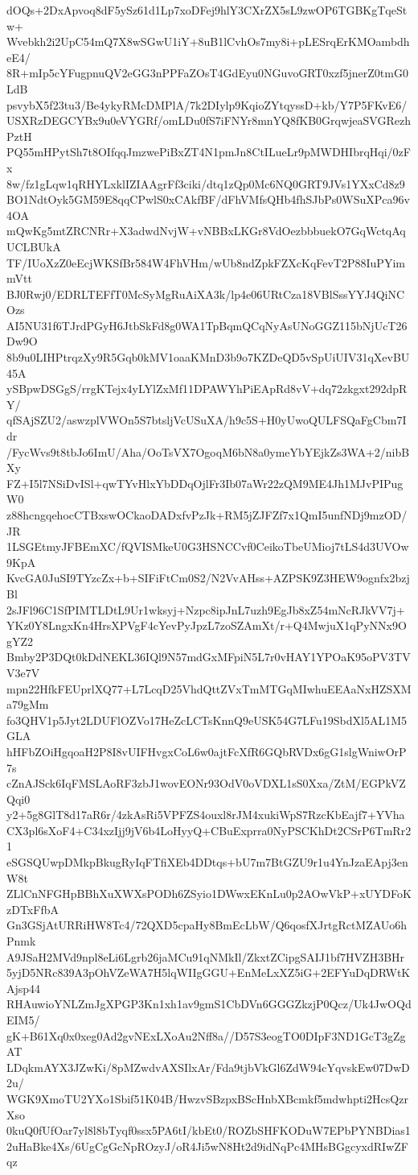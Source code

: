 dOQs+2DxApvoq8dF5ySz61d1Lp7xoDFej9hlY3CXrZX5sL9zwOP6TGBKgTqeStw+
Wvebkh2i2UpC54mQ7X8wSGwU1iY+8uB1lCvhOs7my8i+pLESrqErKMOambdheE4/
8R+mIp5cYFugpnuQV2eGG3nPPFaZOsT4GdEyu0NGuvoGRT0xzf5jnerZ0tmG0LdB
psvybX5f23tu3/Be4ykyRMcDMPlA/7k2DIylp9KqioZYtqyssD+kb/Y7P5FKvE6/
USXRzDEGCYBx9u0eVYGRf/omLDu0fS7iFNYr8mnYQ8fKB0GrqwjeaSVGRezhPztH
PQ55mHPytSh7t8OIfqqJmzwePiBxZT4N1pmJn8CtILueLr9pMWDHIbrqHqi/0zFx
8w/fz1gLqw1qRHYLxklIZIAAgrFf3ciki/dtq1zQp0Mc6NQ0GRT9JVs1YXxCd8z9
BO1NdtOyk5GM59E8qqCPwlS0xCAkfBF/dFhVMfsQHb4fhSJbPs0WSuXPca96v4OA
mQwKg5mtZRCNRr+X3adwdNvjW+vNBBxLKGr8VdOezbbbuekO7GqWctqAqUCLBUkA
TF/IUoXzZ0eEcjWKSfBr584W4FhVHm/wUb8ndZpkFZXcKqFevT2P88IuPYimmVtt
BJ0Rwj0/EDRLTEFfT0McSyMgRuAiXA3k/lp4e06URtCza18VBlSssYYJ4QiNCOzs
AI5NU31f6TJrdPGyH6JtbSkFd8g0WA1TpBqmQCqNyAsUNoGGZ115bNjUcT26Dw9O
8b9u0LIHPtrqzXy9R5Gqb0kMV1oaaKMnD3b9o7KZDeQD5vSpUiUIV31qXevBU45A
ySBpwDSGgS/rrgKTejx4yLYlZxMf11DPAWYhPiEApRd8vV+dq72zkgxt292dpRY/
qfSAjSZU2/aswzplVWOn5S7btsljVcUSuXA/h9c5S+H0yUwoQULFSQaFgCbm7Idr
/FycWvs9t8tbJo6ImU/Aha/OoTsVX7OgoqM6bN8a0ymeYbYEjkZs3WA+2/nibBXy
FZ+I5l7NSiDvISl+qwTYvHlxYbDDqOjlFr3Ib07aWr22zQM9ME4Jh1MJvPIPugW0
z88hcngqehocCTBxswOCkaoDADxfvPzJk+RM5jZJFZf7x1QmI5unfNDj9mzOD/JR
1LSGEtmyJFBEmXC/fQVISMkeU0G3HSNCCvf0CeikoTbeUMioj7tLS4d3UVOw9KpA
KvcGA0JuSI9TYzcZx+b+SIFiFtCm0S2/N2VvAHss+AZPSK9Z3HEW9ognfx2bzjBl
2sJFl96C1SfPIMTLDtL9Ur1wksyj+Nzpc8ipJnL7uzh9EgJb8xZ54mNcRJkVV7j+
YKz0Y8LngxKn4HrsXPVgF4cYevPyJpzL7zoSZAmXt/r+Q4MwjuX1qPyNNx9OgYZ2
Bmby2P3DQt0kDdNEKL36IQl9N57mdGxMFpiN5L7r0vHAY1YPOaK95oPV3TVV3e7V
mpn22HfkFEUprlXQ77+L7LcqD25VhdQttZVxTmMTGqMIwhuEEAaNxHZSXMa79gMm
fo3QHV1p5Jyt2LDUFlOZVo17HeZcLCTsKnnQ9eUSK54G7LFu19SbdXl5AL1M5GLA
hHFbZOiHgqoaH2P8I8vUIFHvgxCoL6w0ajtFcXfR6GQbRVDx6gG1slgWniwOrP7s
cZnAJSck6IqFMSLAoRF3zbJ1wovEONr93OdV0oVDXL1sS0Xxa/ZtM/EGPkVZQqi0
y2+5g8GlT8d17aR6r/4zkAsRi5VPFZS4ouxl8rJM4xukiWpS7RzcKbEajf7+YVha
CX3pl6sXoF4+C34xzIjj9jV6b4LoHyyQ+CBuExprra0NyPSCKhDt2CSrP6TmRr21
eSGSQUwpDMkpBkugRyIqFTfiXEb4DDtqs+bU7m7BtGZU9r1u4YnJzaEApj3enW8t
ZLlCnNFGHpBBhXuXWXsPODh6ZSyio1DWwxEKnLu0p2AOwVkP+xUYDFoKzDTxFfbA
Gn3GSjAtURRiHW8Tc4/72QXD5cpaHy8BmEcLbW/Q6qosfXJrtgRctMZAUo6hPnmk
A9JSaH2MVd9npl8eLi6Lgrb26jaMCu91qNMkIl/ZkxtZCipgSAIJ1bf7HVZH3BHr
5yjD5NRc839A3pOhVZeWA7H5lqWIIgGGU+EnMeLxXZ5iG+2EFYuDqDRWtKAjsp44
RHAuwioYNLZmJgXPGP3Kn1xh1av9gmS1CbDVn6GGGZkzjP0Qcz/Uk4JwOQdEIM5/
gK+B61Xq0x0xeg0Ad2gvNExLXoAu2Nff8a//D57S3eogTO0DIpF3ND1GcT3gZgAT
LDqkmAYX3JZwKi/8pMZwdvAXSIlxAr/Fda9tjbVkGl6ZdW94cYqvskEw07DwD2u/
WGK9XmoTU2YXo1Sbif51K04B/HwzvSBzpxBScHnbXBcmkf5mdwhpti2HcsQzrXso
0kuQ0fUfOar7yl8l8bTyqf0ssx5PA6tI/kbEt0/ROZbSHFKODuW7EPbPYNBDias1
2uHaBke4Xs/6UgCgGcNpROzyJ/oR4Ji5wN8Ht2d9idNqPc4MHsBGgcyxdRIwZFqz
